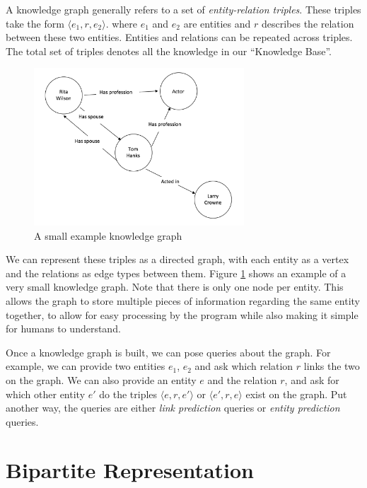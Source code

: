 \documentclass[12pt]{article}
\begin{document}
A knowledge graph generally refers to a set of \textit{entity-relation triples}.
These triples take the form $\langle e_1, r, e_2 \rangle$. where $e_1$ and $e_2$
are entities and $r$ describes the relation between these two entities. Entities
and relations can be repeated across triples. The total set of triples denotes
all the knowledge in our ``Knowledge Base''.

\begin{figure}[t!]
    \centering
    \includegraphics[width=0.7\textwidth,keepaspectratio]{figures/Example_KG.png}
    \caption{A small example knowledge graph}
    \label{fig: Example_KG}
\end{figure}

We can represent these triples as a directed graph, with each entity as a vertex
and the relations as edge types between them. Figure \ref{fig: Example_KG} shows
an example of a very small knowledge graph. Note that there is only one node per
entity. This allows the graph to store multiple pieces of information regarding
the same entity together, to allow for easy processing by the program while also
making it simple for humans to understand.

Once a knowledge graph is built, we can pose queries about the graph. For
example, we can provide two entities $e_1$, $e_2$ and ask which relation $r$
links the two on the graph. We can also provide an entity $e$ and the relation
$r$, and ask for which other entity $e'$ do the triples $\langle e,r,e' \rangle$
or $\langle e',r,e \rangle$ exist on the graph. Put another way, the queries are
either \textit{link prediction} queries or \textit{entity prediction} queries.

\section{Bipartite Representation}
\label{Bipartite Representation}
\end{document}
